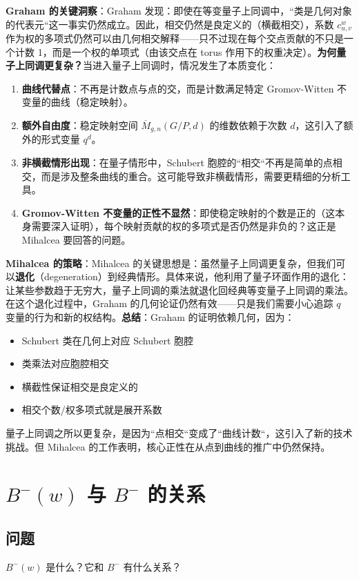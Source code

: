 \textbf{Graham 的关键洞察}：Graham 发现：即使在等变量子上同调中，``类是几何对象的代表元``这一事实仍然成立。因此，相交仍然是良定义的（横截相交），系数 $c_{u,v}^w$ 作为权的多项式仍然可以由几何相交解释——只不过现在每个交点贡献的不只是一个计数 1，而是一个权的单项式（由该交点在 torus 作用下的权重决定）。\textbf{为何量子上同调更复杂？}当进入量子上同调时，情况发生了本质变化：
\begin{enumerate}
\item \textbf{曲线代替点}：不再是计数点与点的交，而是计数满足特定 Gromov-Witten 不变量的曲线（稳定映射）。
\item \textbf{额外自由度}：稳定映射空间 $\overline{M}_{g,n}(G/P, d)$ 的维数依赖于次数 $d$，这引入了额外的形式变量 $q^d$。
\item \textbf{非横截情形出现}：在量子情形中，Schubert 胞腔的``相交``不再是简单的点相交，而是涉及整条曲线的重合。这可能导致非横截情形，需要更精细的分析工具。
\item \textbf{Gromov-Witten 不变量的正性不显然}：即使稳定映射的个数是正的（这本身需要深入证明），每个映射贡献的权的多项式是否仍然是非负的？这正是 Mihalcea 要回答的问题。
\end{enumerate}

\textbf{Mihalcea 的策略}：Mihalcea 的关键思想是：虽然量子上同调更复杂，但我们可以\textbf{退化}（degeneration）到经典情形。具体来说，他利用了量子环面作用的退化：让某些参数趋于无穷大，量子上同调的乘法就退化回经典等变量子上同调的乘法。在这个退化过程中，Graham 的几何论证仍然有效——只是我们需要小心追踪 $q$ 变量的行为和新的权结构。\textbf{总结}：Graham 的证明依赖几何，因为：
\begin{itemize}
\item Schubert 类在几何上对应 Schubert 胞腔
\item 类乘法对应胞腔相交
\item 横截性保证相交是良定义的
\item 相交个数/权多项式就是展开系数
\end{itemize}量子上同调之所以更复杂，是因为``点相交``变成了``曲线计数``，这引入了新的技术挑战。但 Mihalcea 的工作表明，核心正性在从点到曲线的推广中仍然保持。
\section{$B^-(w)$ 与 $B^-$ 的关系}\label{sec:BMinusWvsBMinus}
\subsection{问题}
$B^-(w)$ 是什么？它和 $B^-$ 有什么关系？
